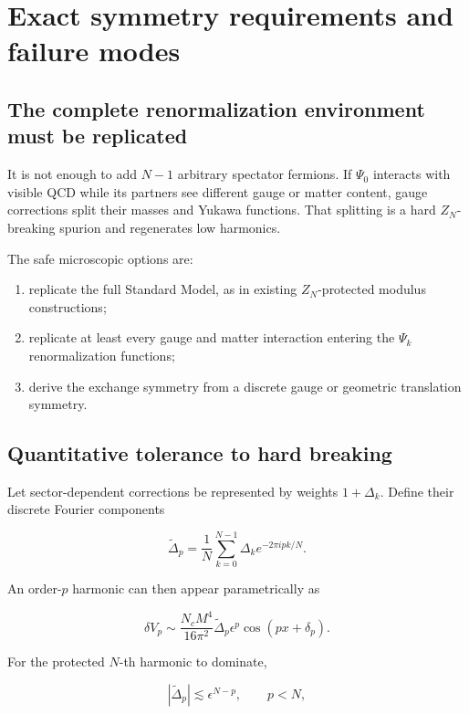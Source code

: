 \documentclass[11pt,a4paper]{article}
\providecommand{\tightlist}{\setlength{\itemsep}{0pt}\setlength{\parskip}{0pt}}
\begin{document}
\section{Exact symmetry requirements and failure
modes}\label{exact-symmetry-requirements-and-failure-modes}

\subsection{The complete renormalization environment must be
replicated}\label{the-complete-renormalization-environment-must-be-replicated}

It is not enough to add \(N-1\) arbitrary spectator fermions. If
\(\Psi_0\) interacts with visible QCD while its partners see different
gauge or matter content, gauge corrections split their masses and Yukawa
functions. That splitting is a hard \(Z_N\)-breaking spurion and
regenerates low harmonics.

The safe microscopic options are:

\begin{enumerate}
\def\labelenumi{\arabic{enumi}.}
\tightlist
\item
  replicate the full Standard Model, as in existing \(Z_N\)-protected
  modulus constructions;
\item
  replicate at least every gauge and matter interaction entering the
  \(\Psi_k\) renormalization functions;
\item
  derive the exchange symmetry from a discrete gauge or geometric
  translation symmetry.
\end{enumerate}

\subsection{Quantitative tolerance to hard
breaking}\label{quantitative-tolerance-to-hard-breaking}

Let sector-dependent corrections be represented by weights
\(1+\Delta_k\). Define their discrete Fourier components

\[
\widetilde\Delta_p
=\frac1N\sum_{k=0}^{N-1}
\Delta_k e^{-2\pi ipk/N}.
\]

An order-\(p\) harmonic can then appear parametrically as

\[
\delta V_p
\sim
\frac{N_cM^4}{16\pi^2}
\widetilde\Delta_p\epsilon^p
\cos(px+\delta_p).
\]

For the protected \(N\)-th harmonic to dominate,

\[
\boxed{
|\widetilde\Delta_p|
\lesssim
\epsilon^{N-p},
\qquad p<N,
}
\]
\end{document}
